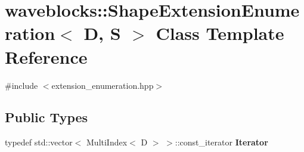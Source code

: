 \hypertarget{classwaveblocks_1_1_shape_extension_enumeration}{}\section{waveblocks\+:\+:Shape\+Extension\+Enumeration$<$ D, S $>$ Class Template Reference}
\label{classwaveblocks_1_1_shape_extension_enumeration}


{\ttfamily \#include $<$extension\+\_\+enumeration.\+hpp$>$}

\subsection*{Public Types}
\begin{DoxyCompactItemize}
\item 
\hypertarget{classwaveblocks_1_1_shape_extension_enumeration_af616a65a7c2bad0c405b658d178f7691}{}typedef std\+::vector$<$ Multi\+Index$<$ D $>$ $>$\+::const\+\_\+iterator {\bfseries Iterator}\label{classwaveblocks_1_1_shape_extension_enumeration_af616a65a7c2bad0c405b658d178f7691}

\end{DoxyCompactItemize}
